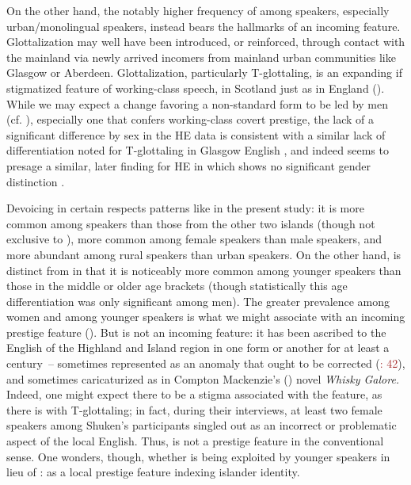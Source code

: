 \documentclass[output=paper,colorlinks,citecolor=brown]{langscibook}
\begin{document}
On the other hand, the notably higher frequency of  among  speakers, especially urban/monolingual speakers, instead bears the hallmarks of an incoming feature. Glottalization may well have been introduced, or reinforced, through contact with the mainland via newly arrived incomers from mainland urban communities like Glasgow or Aberdeen. Glottalization, particularly T-glottaling, is an expanding if stigmatized feature of working-class speech, in Scotland just as in England (\citealt{Wells:1982, Trudgill:1988, Stuart-Smith:1999a, Stuart-Smith:1999b}).
While we may expect a change favoring a non-standard form to be led by men (cf. \citealt{Trudgill:1972, Labov:1963}), especially one that confers working-class covert prestige, the lack of a significant difference by sex in the HE data is consistent with a similar lack of differentiation noted for T-glottaling in Glasgow English \citep{Stuart-Smith:1999a}, and indeed seems to presage a similar, later finding for HE in which  shows no significant gender distinction \citep{Clayton:2018}.

Devoicing in certain respects patterns like  in the present study: it is more common among  speakers than those from the other two islands (though not exclusive to ), more common among female speakers than male speakers, and more abundant among rural speakers than urban speakers. On the other hand,  is distinct from  in that it is noticeably more common among younger speakers than those in the middle or older age brackets (though statistically this age differentiation was only significant among men). The greater prevalence among women and among younger speakers is what we might associate with an incoming prestige feature (\citealt{Labov:1990, Eckert:1989}). But  is not an incoming feature: it has been ascribed to the English of the Highland and Island region in one form or another for at least a century~-- sometimes represented as an anomaly that ought to be corrected (\citealt{Grant:1913}\textcolor{brown}{: 42}), and sometimes caricaturized as in Compton Mackenzie's (\citeyear{Mackenzie:1947}) novel \textit{Whisky Galore.} Indeed, one might expect there to be a stigma associated with the feature, as there is with T-glottaling; in fact, during their interviews, at least two female speakers among Shuken’s participants singled out  as an incorrect or problematic aspect of the local English. Thus,  is not a prestige feature in the conventional sense. One wonders, though, whether  is being exploited by younger speakers in lieu of : as a local prestige feature indexing islander identity. 
\end{document}
